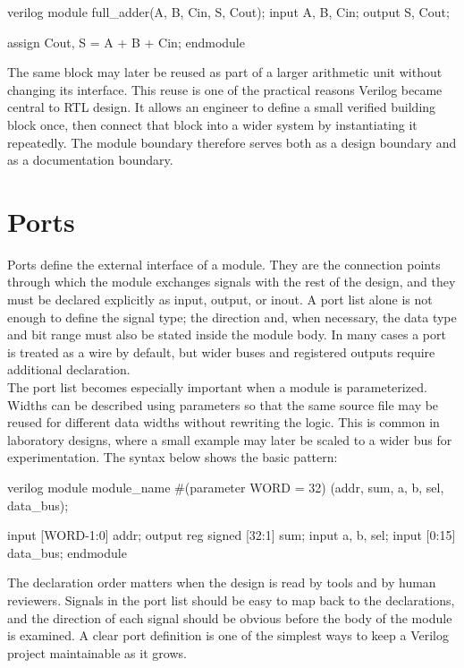 \begin{codeblock}{verilog}
module full_adder(A, B, Cin, S, Cout);
    input A, B, Cin;
    output S, Cout;

    assign {Cout, S} = A + B + Cin;
endmodule
\end{codeblock}

\noindent The same block may later be reused as part of a larger arithmetic unit without changing its
interface. This reuse is one of the practical reasons Verilog became central to RTL design. It allows
an engineer to define a small verified building block once, then connect that block into a wider
system by instantiating it repeatedly. The module boundary therefore serves both as a design boundary
and as a documentation boundary.

\section{Ports}

Ports define the external interface of a module. They are the connection points through which the
module exchanges signals with the rest of the design, and they must be declared explicitly as input,
output, or inout. A port list alone is not enough to define the signal type; the direction and, when
necessary, the data type and bit range must also be stated inside the module body. In many cases a
port is treated as a wire by default, but wider buses and registered outputs require additional
declaration.\\

\noindent The port list becomes especially important when a module is parameterized. Widths can be
described using parameters so that the same source file may be reused for different data widths
without rewriting the logic. This is common in laboratory designs, where a small example may later be
scaled to a wider bus for experimentation. The syntax below shows the basic pattern:

\begin{codeblock}{verilog}
module module_name
    #(parameter WORD = 32)
    (addr, sum, a, b, sel, data_bus);

    input  [WORD-1:0] addr;
    output reg signed [32:1] sum;
    input  a, b, sel;
    input  [0:15] data_bus;
endmodule
\end{codeblock}

\noindent The declaration order matters when the design is read by tools and by human reviewers.
Signals in the port list should be easy to map back to the declarations, and the direction of each
signal should be obvious before the body of the module is examined. A clear port definition is one of
the simplest ways to keep a Verilog project maintainable as it grows.


